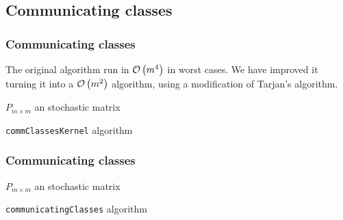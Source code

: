 \subsection{Communicating classes}
 \begin{frame}\frametitle{Communicating classes}
    \vspace{3em}
    The original algorithm run in \(\mathcal{O}\left(m^4\right)\) in worst cases. We have improved it 
    turning it into a \(\mathcal{O}\left(m^2\right)\) algorithm, using a modification of Tarjan's algorithm.
    \vspace{-1em}
    \begin{algorithm}[H]
    \begin{algorithmic}[1]
    \REQUIRE $P_{m \times m}$ an stochastic matrix
    \NEWLINE
        \ENDFOR
        \ENDFOR
        \ENDFOR
    \ENDFOR
    \NEWLINE
    \RETURN{$[C, v]$}
    \end{algorithmic}
    \caption{\texttt{commClassesKernel} algorithm}
    \label{alg:commClassesKernel}
    \end{algorithm}

\end{frame}

\begin{frame} \frametitle{Communicating classes}
    \vspace{2em}
    \begin{algorithm}[H]
    \begin{algorithmic}[1]
    \REQUIRE $P_{m \times m}$ an stochastic matrix
    \NEWLINE
            \ENDIF
        \ENDFOR
        \ENDIF
    \ENDFOR
    \NEWLINE
    \end{algorithmic}
    \caption{\texttt{communicatingClasses} algorithm}
    \label{alg:commClasses}
    \end{algorithm}
    
\end{frame}
